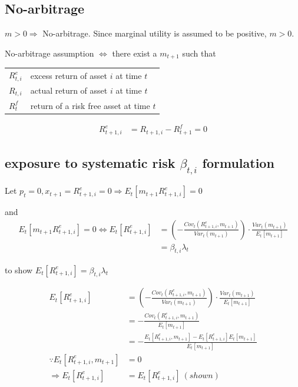 \documentclass[11pt, oneside]{article}   	%
\begin{document}
\subsection{No-arbitrage}

$m > 0 \Rightarrow$ No-arbitrage. Since marginal utility is assumed to be positive, $m > 0$.

No-arbitrage assumption $\Leftrightarrow$ there exist a $m_{t+1}$ such that

\begin{tabular}{l @{ := } l}
    $R^e_{t,i}$ & excess return of asset $i$ at time $t$ \\
    $R_{t,i}$ & actual return of asset $i$ at time $t$ \\
    $R^f_t$ & return of a risk free asset at time $t$
\end{tabular}

\begin{align*}
    R^e_{t+1, i} &= R_{t+1, i} - R^f_{t+1} = 0
\end{align*}

\subsection{exposure to systematic risk $\beta_{t, i}$ formulation}

Let $p_t = 0, x_{t+1} = R^e_{t+1, i} = 0 \Rightarrow E_t\left[ m_{t+1}R^e_{t+1, i}  \right] =0$

and
\begin{align*}
    E_t\left[ m_{t+1}R^e_{t+1, i}  \right] = 0 \Leftrightarrow E_t\left[ R^e_{t+1,i}  \right] 
    &= \left( - \frac{Cov_t(R^e_{t+1, i}, m_{t+1} )}{Var_t(m_{t+1})}  \right) \cdot \frac{Var_t(m_{t+1})}{E_t\left[ m_{t+1}  \right]} \\
    &= \beta_{t,i}\lambda_t
\end{align*}

to show $E_t\left[ R^e_{t+1, i}  \right] = \beta_{t, i}\lambda_t$

\begin{align*}
    E_t\left[ R^e_{t+1,i}  \right] &=
    \left( - \frac{Cov_t(R^e_{t+1, i}, m_{t+1} )}{Var_t(m_{t+1})}  \right) \cdot \frac{Var_t(m_{t+1})}{E_t\left[ m_{t+1}
    \right]} \\
                                   &= - \frac{Cov_t(R^e_{t+1, i}, m_{t+1})}{E_t\left[ m_{t+1}  \right]} \\
                                   &= - \frac{E_t\left[ R^e_{t+1, i}, m_{t+1}  \right] - E_t\left[ R^e_{t+1, i}
                                   \right]E_t\left[ m_{t+1}  \right]}{E_t\left[ m_{t+1}  \right]} \\
    \because E_t\left[ R^e_{t+1, i}, m_{t+1}  \right] &= 0 \\
    \Rightarrow E_t\left[ R^e_{t+1, i}  \right] &= E_t \left[ R^e_{t+1, i}  \right]~(shown)
\end{align*}
\end{document}
